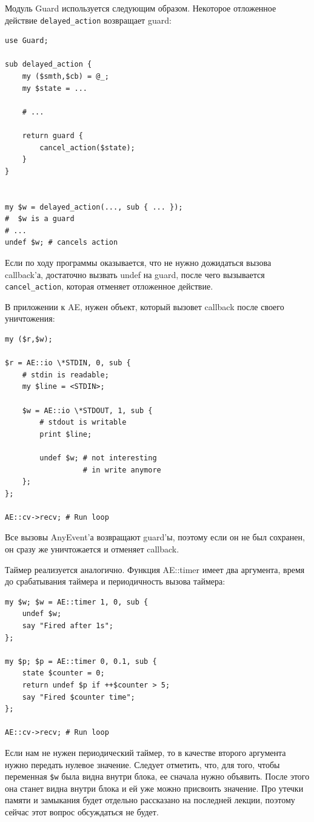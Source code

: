 Модуль Guard используется следующим образом. Некоторое отложенное действие \verb|delayed_action| возвращает guard:
\begin{verbatim}
use Guard;

sub delayed_action {
    my ($smth,$cb) = @_;
    my $state = ...

    # ...

    return guard {
        cancel_action($state);
    }
}


my $w = delayed_action(..., sub { ... });
#  $w is a guard
# ...
undef $w; # cancels action
\end{verbatim}
Если по ходу программы оказывается, что не нужно дожидаться вызова callback'а, достаточно вызвать undef на guard, после чего вызывается \verb|cancel_action|, которая отменяет отложенное действие.

В приложении к AE, нужен объект, который вызовет callback после своего уничтожения:
\begin{verbatim}
my ($r,$w);

$r = AE::io \*STDIN, 0, sub {
    # stdin is readable;
    my $line = <STDIN>;

    $w = AE::io \*STDOUT, 1, sub {
        # stdout is writable
        print $line;

        undef $w; # not interesting
                  # in write anymore
    };
};

AE::cv->recv; # Run loop
\end{verbatim}
Все вызовы AnyEvent'а возвращают guard'ы, поэтому если он не был сохранен, он сразу же уничтожается и отменяет callback.

Таймер реализуется аналогично. Функция AE::timer имеет два аргумента, время до срабатывания таймера и периодичность вызова таймера:
\begin{verbatim}
my $w; $w = AE::timer 1, 0, sub {
    undef $w;
    say "Fired after 1s";
};

my $p; $p = AE::timer 0, 0.1, sub {
    state $counter = 0;
    return undef $p if ++$counter > 5;
    say "Fired $counter time";
};

AE::cv->recv; # Run loop
\end{verbatim}
Если нам не нужен периодический таймер, то в качестве второго аргумента нужно передать нулевое значение. Следует отметить, что, для того, чтобы переменная \verb|$w| была видна внутри блока, ее сначала нужно объявить. После этого она станет видна внутри блока и ей уже можно присвоить значение. Про утечки памяти и замыкания будет отдельно рассказано на последней лекции, поэтому сейчас этот вопрос обсуждаться не будет.

